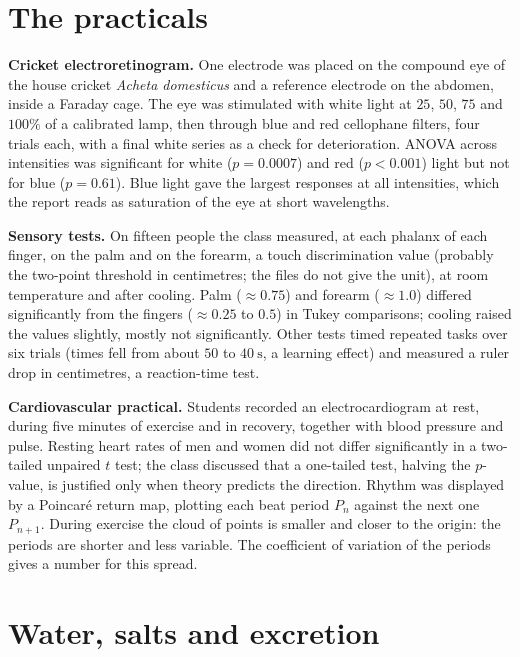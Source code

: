 \section{The practicals}
\label{section-practicals}

\textbf{Cricket electroretinogram.}
One electrode was placed on the compound
eye of the house cricket \emph{Acheta
domesticus} and a reference electrode on
the abdomen, inside a Faraday cage. The
eye was stimulated with white light at
$25$, $50$, $75$ and $100\%$ of a
calibrated lamp, then through blue and
red cellophane filters, four trials each,
with a final white series as a check for
deterioration. ANOVA across intensities
was significant for white
($p = 0.0007$) and red ($p < 0.001$)
light but not for blue ($p = 0.61$).
Blue light gave the largest responses at
all intensities, which the report reads
as saturation of the eye at short
wavelengths.

\textbf{Sensory tests.}
On fifteen people the class measured, at
each phalanx of each finger, on the palm
and on the forearm, a touch
discrimination value (probably the
two-point threshold in centimetres; the
files do not give the unit), at room
temperature and after cooling. Palm
($\approx 0.75$) and forearm
($\approx 1.0$) differed significantly
from the fingers ($\approx 0.25$ to
$0.5$) in Tukey comparisons; cooling
raised the values slightly, mostly not
significantly. Other tests timed
repeated tasks over six trials (times fell
from about $50$ to $40\ \mathrm{s}$, a
learning effect) and measured a ruler
drop in centimetres, a reaction-time test.

\textbf{Cardiovascular practical.}
Students recorded an electrocardiogram at
rest, during five minutes of exercise and
in recovery, together with blood pressure
and pulse. Resting heart rates of men and
women did not differ significantly in a
two-tailed unpaired $t$ test; the class
discussed that a one-tailed test, halving
the $p$-value, is justified only when
theory predicts the direction. Rhythm was
displayed by a Poincar\'e return map,
plotting each beat period $P_n$ against
the next one $P_{n+1}$. During exercise
the cloud of points is smaller and closer
to the origin: the periods are shorter
and less variable. The coefficient of
variation of the periods gives a number
for this spread.

\section{Water, salts and excretion}
\label{section-osmoregulation}

